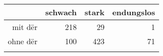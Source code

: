\begin{tabular}{rrrr}
  \lsptoprule
 & schwach & stark & endungslos \\ 
  \midrule
mit dër & 218 & 29 & 1 \\ 
  ohne dër & 100 & 423 & 71 \\ 
   \lspbottomrule
\end{tabular}
